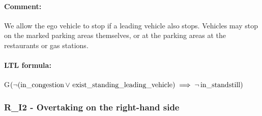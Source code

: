 \paragraph{Comment:} We allow the ego vehicle to stop if a leading vehicle also stops. Vehicles may stop on the marked parking areas themselves, or at the parking areas at the
restaurants or gas stations. 

\paragraph{LTL formula:} G$(\neg(\operatorname*{in\_congestion} \lor \, \operatorname*{exist\_standing\_leading\_vehicle}) \implies \neg \operatorname*{in\_standstill})$

\subsubsection{R\_I2 - Overtaking on the right-hand side}
